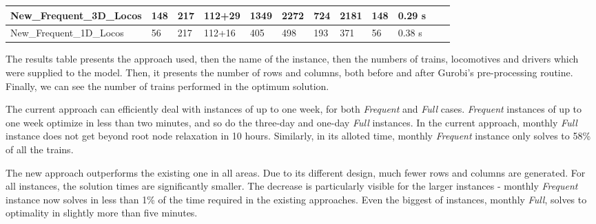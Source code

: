 \begin{landscape}
\begin{table}[h]
\begin{tabular}{@{}llllllllllll@{}}
				New\_Frequent\_3D\_Locos   & 148                          & 217                          & 112+29                              & \num{1349}        & \num{2272}                  & \num{724}       & \num{2181}                   & 148                        & 0.29 s                            \\	\hline			
				New\_Frequent\_1D\_Locos   & 56                          & 217                          & 112+16                              & \num{405}        & \num{498}                  & \num{193}       & \num{371}                   & 56                        & 0.38 s                           \\	\hline							
				
			\end{tabular}
		\end{table}
	\end{landscape}

The results table presents the approach used, then the name of the instance, then the numbers of trains, locomotives and drivers which were supplied to the model. Then, it presents the number of rows and columns, both before and after Gurobi's pre-processing routine. Finally, we can see the number of trains performed in the optimum solution.

The current approach can efficiently deal with instances of up to one week, for both \emph{Frequent} and \emph{Full} cases. \emph{Frequent} instances of up to one week optimize in less than two minutes, and so do the three-day and one-day \emph{Full} instances. In the current approach, monthly \emph{Full} instance does not get beyond root node relaxation in 10 hours. Similarly, in its alloted time, monthly \emph{Frequent} instance only solves to 58\% of all the trains.

The new approach outperforms the existing one in all areas. Due to its different design, much fewer rows and columns are generated. For all instances, the solution times are significantly smaller. The decrease is particularly visible for the larger instances - monthly \emph{Frequent} instance now solves in less than 1\% of the time required in the existing approaches. Even the biggest of instances, monthly \emph{Full}, solves to optimality in slightly more than five minutes. 